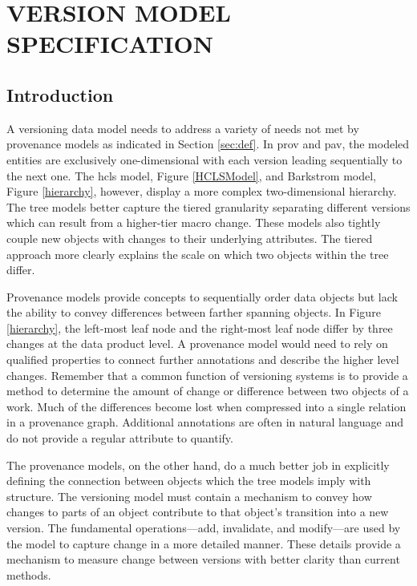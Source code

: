 

\chapter{VERSION MODEL SPECIFICATION}\label{ch:model}

\section{Introduction}

A versioning data model needs to address a variety of needs not met by provenance models as indicated in Section \ref{sec:def}.
In \gls{prov} and \gls{pav}, the modeled entities are exclusively one-dimensional with each version leading sequentially to the next one.
The \gls{hcls} model, Figure \ref{HCLSModel}, and Barkstrom model, Figure \ref{hierarchy}, however, display a more complex two-dimensional hierarchy.
The tree models better capture the tiered granularity separating different versions which can result from a higher-tier macro change.
These models also tightly couple new objects with changes to their underlying attributes.
The tiered approach more clearly explains the scale on which two objects within the tree differ.

Provenance models provide concepts to sequentially order data objects but lack the ability to convey differences between farther spanning objects.
In Figure \ref{hierarchy}, the left-most leaf node and the right-most leaf node differ by three changes at the data product level.
A provenance model would need to rely on qualified properties to connect further annotations and describe the higher level changes.
Remember that a common function of versioning systems is to provide a method to determine the amount of change or difference between two objects of a work.
Much of the differences become lost when compressed into a single relation in a provenance graph.
Additional annotations are often in natural language and do not provide a regular attribute to quantify.

The provenance models, on the other hand, do a much better job in explicitly defining the connection between objects which the tree models imply with structure.
The versioning model must contain a mechanism to convey how changes to parts of an object contribute to that object's transition into a new version.
The fundamental operations---\gls{add}, \gls{invalidate}, and \gls{modify}---are used by the model to capture change in a more detailed manner.
These details provide a mechanism to measure change between versions with better clarity than current methods.

